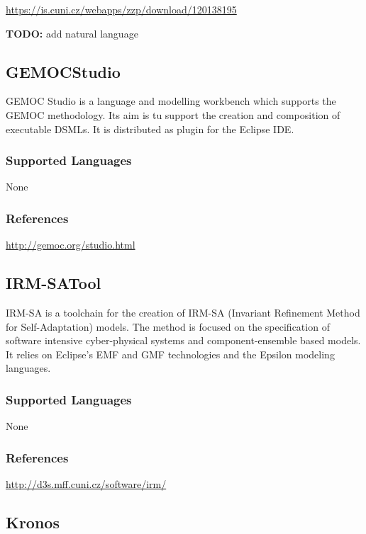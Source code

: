 \url{https://is.cuni.cz/webapps/zzp/download/120138195}


\textbf{TODO:} add natural language


\subsection{GEMOCStudio}
\label{subsecT:GEMOCStudio}

GEMOC Studio is a language and modelling workbench which supports the GEMOC methodology.
Its aim is tu support the creation and composition of executable DSMLs.
It is distributed as plugin for the Eclipse IDE.

\subsubsection{Supported Languages}

None


\subsubsection{References}

\url{http://gemoc.org/studio.html}



\subsection{IRM-SATool}
\label{subsecT:IRM-SATool}


IRM-SA is a toolchain for the creation of IRM-SA (Invariant Refinement Method for Self-Adaptation) models.
The method is focused on the specification of software intensive cyber-physical systems and component-ensemble based models.
It relies on Eclipse's EMF and GMF technologies and the Epsilon modeling languages.
\subsubsection{Supported Languages}

None


\subsubsection{References}

\url{http://d3s.mff.cuni.cz/software/irm/}




\subsection{Kronos}
\label{subsecT:Kronos}

